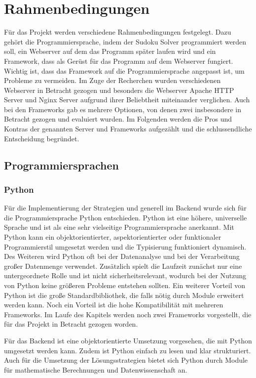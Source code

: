 
\chapter{Rahmenbedingungen}
Für das Projekt werden verschiedene Rahmenbedingungen festgelegt. Dazu gehört die Programmiersprache, indem der Sudoku Solver programmiert werden soll, ein Webserver auf dem das Programm später laufen wird und ein Framework, dass als Gerüst für das Programm auf dem Webserver fungiert. Wichtig ist, dass das Framework auf die Programmiersprache angepasst ist, um Probleme zu vermeiden. Im Zuge der Recherchen wurden verschiedenen Webserver in Betracht gezogen und besonders die Webserver Apache HTTP Server und Nginx Server aufgrund ihrer Beliebtheit miteinander verglichen. Auch bei den Frameworks gab es mehrere Optionen, von denen zwei insbesondere in Betracht gezogen und evaluiert wurden. Im Folgenden werden die Pros und Kontras  der genannten Server und Frameworks aufgezählt und die schlussendliche Entscheidung begründet.

\section{Programmiersprachen}
\subsection{Python}
Für die Implementierung der Strategien und generell im Backend wurde sich für die Programmiersprache Python entschieden. Python ist eine höhere, universelle Sprache und ist als eine sehr vielseitige Programmiersprache anerkannt. Mit Python kann ein objektorientierter, aspektorientierter oder funktionaler Programmierstil umgesetzt werden und die Typisierung funktioniert dynamisch. Des Weiteren wird Python oft bei der Datenanalyse und bei der Verarbeitung großer Datenmenge verwendet. Zusätzlich spielt die Laufzeit zunächst nur eine untergeordnete Rolle und ist nicht sicherheitsrelevant, wodurch bei der Nutzung von Python keine größeren Probleme entstehen sollten.
Ein weiterer Vorteil von Python ist die große Standardbibliothek, die falls nötig durch Module erweitert werden kann. Noch ein Vorteil ist die hohe Kompatibilität mit mehreren Frameworks. Im Laufe des Kapitels werden noch zwei Frameworks vorgestellt, die für das Projekt in Betracht gezogen worden.

Für das Backend ist eine objektorientierte Umsetzung vorgesehen, die mit Python umgesetzt werden kann. Zudem ist Python einfach zu lesen und klar strukturiert. Auch für die Umsetzung der Lösungsstrategien bietet sich Python durch Module für mathematische Berechnungen und Datenwissenschaft an. 

